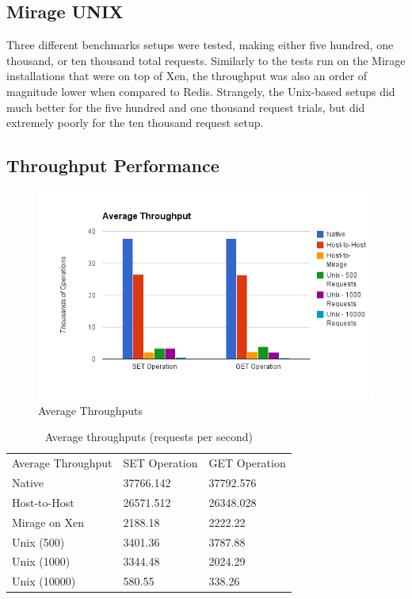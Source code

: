 \documentclass[english,10pt,twocolumn]{article}
\begin{document}
\subsection{Mirage \- UNIX}

Three different benchmarks setups were tested, making either five hundred, one thousand, or ten thousand total requests. 
Similarly to the tests run on the Mirage installations that were on top of Xen, the throughput was also an order of magnitude lower when compared to Redis. 
Strangely, the Unix-based setups did much better for the five hundred and one thousand request trials, but did extremely poorly for the ten thousand request setup.

\subsection{Throughput Performance}

\begin{figure}[ht]
  \centering
  \caption{Average Throughputs}
  \includegraphics[width=1.0\textwidth]{images/throughput}
\end{figure}

\begin{table}[h]
\begin{tabular}{lll}
Average Throughput & SET Operation & GET Operation \\
Native & 37766.142 & 37792.576 \\
Host-to-Host & 26571.512 & 26348.028 \\
Mirage on Xen & 2188.18 & 2222.22 \\
Unix (500) & 3401.36 & 3787.88 \\
Unix (1000) & 3344.48 & 2024.29 \\
Unix (10000) & 580.55 & 338.26
\end{tabular}
\caption{Average throughputs (requests per second)}
\label{my-label}
\end{table}
\end{document}
